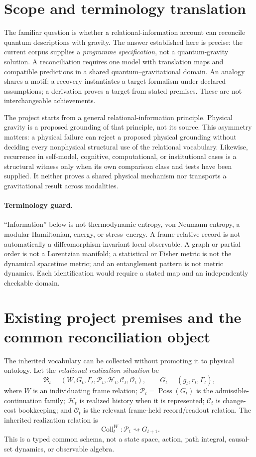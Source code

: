 \documentclass[11pt,a4paper]{article}
\theoremstyle{remark}
\newcommand{\Rel}{\mathfrak R}
\newcommand{\Poss}{\mathcal P}
\newcommand{\Hist}{\mathcal H}
\newcommand{\Load}{\mathcal C}
\newcommand{\Obs}{\mathcal O}
\begin{document}
\section{Scope and terminology translation}\label{sec:scope}
The familiar question is whether a relational-information account can reconcile
quantum descriptions with gravity. The answer established here is precise: the
current corpus supplies a \emph{programme specification}, not a quantum-gravity
solution. A reconciliation requires one model with translation maps and
compatible predictions in a shared quantum--gravitational domain. An analogy
shares a motif; a recovery instantiates a target formalism under declared
assumptions; a derivation proves a target from stated premises. These are not
interchangeable achievements.

The project starts from a general relational-information principle. Physical
gravity is a proposed grounding of that principle, not its source. This
asymmetry matters: a physical failure can reject a proposed physical grounding
without deciding every nonphysical structural use of the relational vocabulary.
Likewise, recurrence in self-model, cognitive, computational, or institutional
cases is a structural witness only when its own comparison class and tests have
been supplied. It neither proves a shared physical mechanism nor transports a
gravitational result across modalities.

\paragraph{Terminology guard.} ``Information'' below is not thermodynamic
entropy, von Neumann entropy, a modular Hamiltonian, energy, or stress--energy.
A frame-relative record is not automatically a diffeomorphism-invariant local
observable. A graph or partial order is not a Lorentzian manifold; a statistical
or Fisher metric is not the dynamical spacetime metric; and an entanglement
pattern is not metric dynamics. Each identification would require a stated map
and an independently checkable domain.

\section{Existing project premises and the common reconciliation object}\label{sec:object}
The inherited vocabulary can be collected without promoting it to physical
ontology. Let the \emph{relational realization situation} be
\[
 \Rel_t=(W,G_t,\Gamma_t,\Poss_t,\Hist_t,\Load_t,\Obs_t),
 \qquad G_t=(g_t,r_t,\Gamma_t),
\]
where $W$ is an individuating frame relation; $\Poss_t=\operatorname{Poss}(G_t)$
is the admissible-continuation family; $\Hist_t$ is realized history when it is
represented; $\Load_t$ is change-cost bookkeeping; and $\Obs_t$ is the relevant
frame-held record/readout relation. The inherited realization relation is
\[
 \operatorname{Coll}^{W}_t:\Poss_t\rightsquigarrow G_{t+1}.
\]
This is a typed common schema, not a state space, action, path integral,
causal-set dynamics, or observable algebra.
\end{document}
